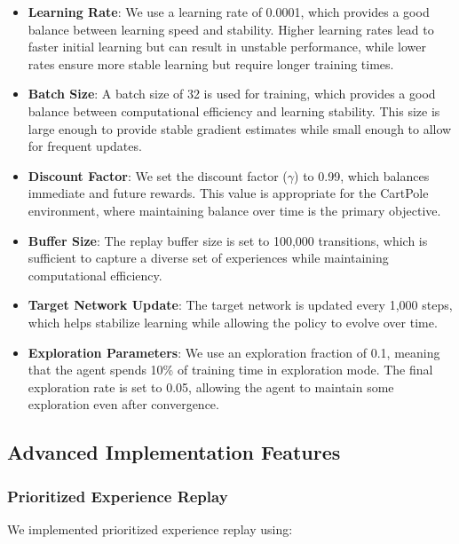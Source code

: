 \documentclass[conference]{IEEEtran}
\begin{document}
\begin{itemize}
    \item \textbf{Learning Rate}: We use a learning rate of 0.0001, which provides a good balance between learning speed and stability. Higher learning rates lead to faster initial learning but can result in unstable performance, while lower rates ensure more stable learning but require longer training times.
    
    \item \textbf{Batch Size}: A batch size of 32 is used for training, which provides a good balance between computational efficiency and learning stability. This size is large enough to provide stable gradient estimates while small enough to allow for frequent updates.
    
    \item \textbf{Discount Factor}: We set the discount factor ($\gamma$) to 0.99, which balances immediate and future rewards. This value is appropriate for the CartPole environment, where maintaining balance over time is the primary objective.
    
    \item \textbf{Buffer Size}: The replay buffer size is set to 100,000 transitions, which is sufficient to capture a diverse set of experiences while maintaining computational efficiency.
    
    \item \textbf{Target Network Update}: The target network is updated every 1,000 steps, which helps stabilize learning while allowing the policy to evolve over time.
    
    \item \textbf{Exploration Parameters}: We use an exploration fraction of 0.1, meaning that the agent spends 10\% of training time in exploration mode. The final exploration rate is set to 0.05, allowing the agent to maintain some exploration even after convergence.
\end{itemize}

\subsection{Advanced Implementation Features}
\subsubsection{Prioritized Experience Replay}
We implemented prioritized experience replay using:
\end{document}
